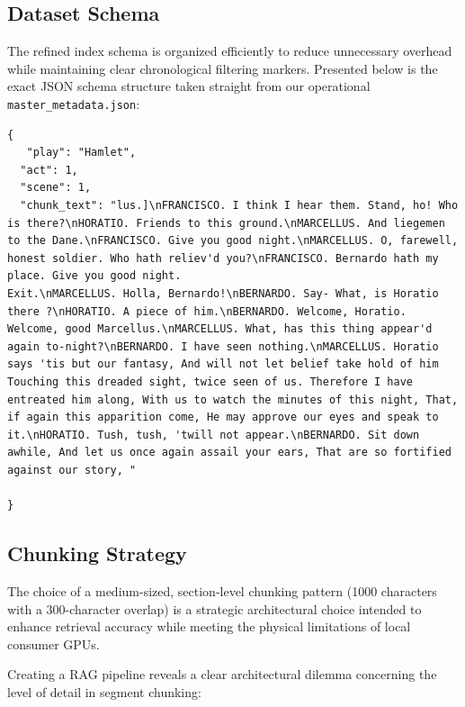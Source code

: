 \documentclass[10pt,conference]{IEEEtran}
\begin{document}
\subsection{Dataset Schema}
The refined index schema is organized efficiently to reduce unnecessary overhead while maintaining clear chronological filtering markers. Presented below is the exact JSON schema structure taken straight from our operational \verb|master_metadata.json|:

\begin{verbatim}
{
   "play": "Hamlet",
  "act": 1,
  "scene": 1,
  "chunk_text": "lus.]\nFRANCISCO. I think I hear them. Stand, ho! Who is there?\nHORATIO. Friends to this ground.\nMARCELLUS. And liegemen to the Dane.\nFRANCISCO. Give you good night.\nMARCELLUS. O, farewell, honest soldier. Who hath reliev'd you?\nFRANCISCO. Bernardo hath my place. Give you good night.                                   Exit.\nMARCELLUS. Holla, Bernardo!\nBERNARDO. Say- What, is Horatio there ?\nHORATIO. A piece of him.\nBERNARDO. Welcome, Horatio. Welcome, good Marcellus.\nMARCELLUS. What, has this thing appear'd again to-night?\nBERNARDO. I have seen nothing.\nMARCELLUS. Horatio says 'tis but our fantasy, And will not let belief take hold of him Touching this dreaded sight, twice seen of us. Therefore I have entreated him along, With us to watch the minutes of this night, That, if again this apparition come, He may approve our eyes and speak to it.\nHORATIO. Tush, tush, 'twill not appear.\nBERNARDO. Sit down awhile, And let us once again assail your ears, That are so fortified against our story, "

}
\end{verbatim}

\subsection{Chunking Strategy}

The choice of a medium-sized, section-level chunking pattern (1000 characters with a 300-character overlap) is a strategic architectural choice intended to enhance retrieval accuracy while meeting the physical limitations of local consumer GPUs.

Creating a RAG pipeline reveals a clear architectural dilemma concerning the level of detail in segment chunking:
\end{document}
